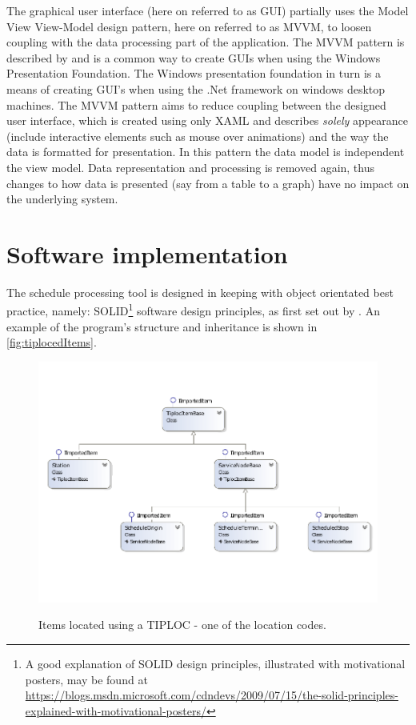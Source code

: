 The graphical user interface (here on referred to as GUI) partially uses the Model View View-Model design pattern, here on referred to as MVVM, to loosen coupling with the data processing part of the application. The MVVM pattern is described by \citet{Microsoft2012} and is a common way to create GUIs when using the Windows Presentation Foundation. The Windows presentation foundation in turn is a means of creating GUI's when using the .Net framework on windows desktop machines. The MVVM pattern aims to reduce coupling between the designed user interface, which is created using only XAML and describes \emph{solely} appearance (include  interactive elements such as mouse over animations) and the way the data is formatted for presentation. In this pattern the data model is independent the view model.  Data representation and processing is removed again, thus changes to how data is presented (say from a table to a graph) have no impact on the underlying system.

\section{Software implementation} 
The schedule processing tool is designed in keeping with object orientated best practice, namely: SOLID\footnote{A good explanation of SOLID design principles, illustrated with motivational posters, may be found at \url{https://blogs.msdn.microsoft.com/cdndevs/2009/07/15/the-solid-principles-explained-with-motivational-posters/}} software design principles, as first set out by \citet{Martin2003}. An example of the program's structure and inheritance is shown in \autoref{fig:tiplocedItems}.  

 \begin{figure}[!h]
\myfloatalign
{\includegraphics[width=\linewidth]{gfx/ItemsWithTIPLOCsResized}} 
\caption{Items located using a TIPLOC - one of the location codes.}
\label{fig:tiplocedItems}
\end{figure}

